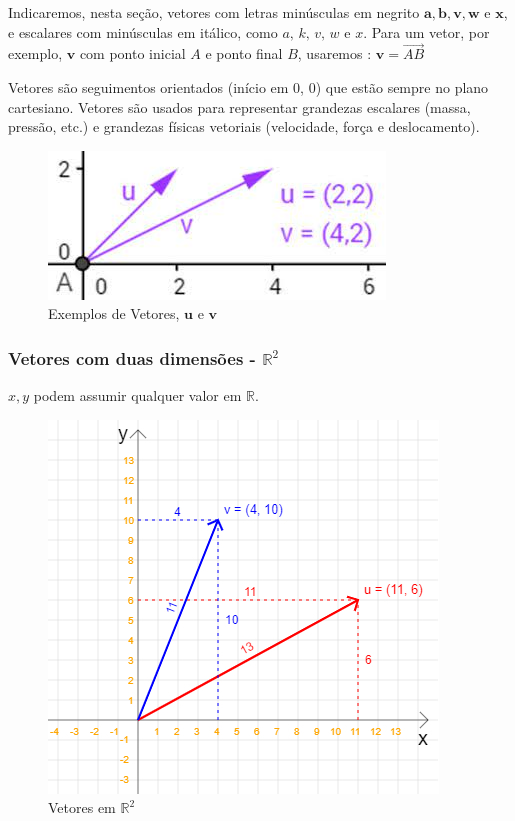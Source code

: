 \documentclass[12pt]{article}
\begin{document}
Indicaremos, nesta seção, vetores com letras minúsculas em negrito $\mathbf{a, b, v, w}$ e $\mathbf{x}$, e escalares com minúsculas em itálico, como $\textit{a, k, v, w}$ e $\textit{x}$. Para um vetor, por exemplo, $\mathbf{v}$ com ponto inicial $\textit{A}$ e ponto final $\textit{B}$, usaremos \cite{anton2012algebra}: $\mathbf{v} = \overrightarrow{\textit{AB}}$


Vetores são seguimentos orientados (início em 0, 0) que estão sempre no plano cartesiano. Vetores são usados para representar grandezas escalares (massa, pressão, etc.) e grandezas físicas vetoriais (velocidade, força e deslocamento).

\begin{figure}[H]
	\centering
	\includegraphics[width=.5\linewidth]{figuras/vetores_01}
	\caption[Vetores \textbf{u} e \textbf{v}]{Exemplos de Vetores, \(\textbf{u}\) e \(\textbf{v}\)}
	\label{fig:vetores01}
\end{figure}

\subsubsection{Vetores com duas dimensões - \(\mathbb{R}^2\)}

\(x, y\) podem assumir qualquer valor em \(\mathbb{R}\).

\begin{figure}[H]
	\centering
	\includegraphics[height=.3\textheight]{figuras/vetores_02}
	\caption[Vetores em \( \mathbf{R}^{2} \)]{Vetores em \(\mathbb{R}^2\)}
	\label{fig:vetores02}
\end{figure}
\end{document}
